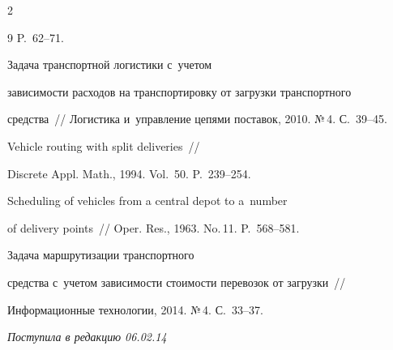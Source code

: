 \begin{multicols}{2}
{{\begin{thebibliography}{9}
P.~62--71.




 Задача транспортной логистики с~учетом


зависимости расходов на транспортировку от загрузки транспортного


средства~// Логистика и~управление цепями поставок, 2010. №\,4. С.~39--45.




 Vehicle routing with split deliveries~//


Discrete Appl. Math., 1994. Vol.~50. P.~239--254.







 Scheduling of vehicles from a central depot to a~number


of delivery points~// Oper. Res., 1963. No.\,11. P.~568--581.







 Задача маршрутизации транспортного


средства с~учетом зависимости стоимости перевозок от загрузки~//


Информационные технологии, 2014. №\,4. С.~33--37.





 \end{thebibliography}





 }


 }





\end{multicols}





\vspace*{-3pt}





\hfill{\small\textit{Поступила в редакцию 06.02.14}}





\newpage





